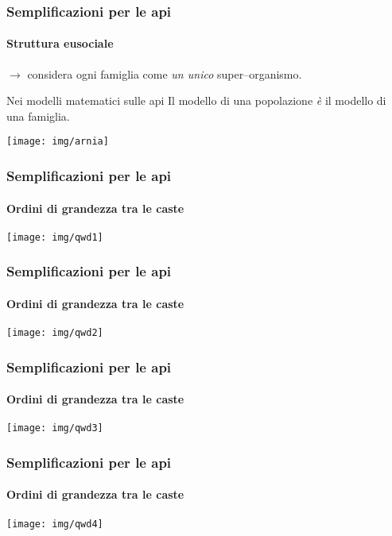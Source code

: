 \documentclass[]{beamer} %
\begin{document}
\begin{frame}
    \frametitle{Semplificazioni per le api}
    \framesubtitle{Struttura eusociale}

    $\rightarrow$ considera ogni famiglia come \emph{un unico} super--organismo.

    \pause
    \begin{alertblock}{Nei modelli matematici sulle api}
        \centering
        Il modello di una popolazione \emph{è} il modello di una famiglia.

        \texttt{[image: img/arnia]}
    \end{alertblock}


\end{frame}

\begin{frame}
    \frametitle{Semplificazioni per le api}
    \framesubtitle{Ordini di grandezza tra le caste}

    \begin{center}
        \texttt{[image: img/qwd1]}
    \end{center}
\end{frame}

\begin{frame}
    \frametitle{Semplificazioni per le api}
    \framesubtitle{Ordini di grandezza tra le caste}

    \begin{center}
        \texttt{[image: img/qwd2]}
    \end{center}
\end{frame}

\begin{frame}
    \frametitle{Semplificazioni per le api}
    \framesubtitle{Ordini di grandezza tra le caste}

    \begin{center}
        \texttt{[image: img/qwd3]}
    \end{center}
\end{frame}

\begin{frame}
    \frametitle{Semplificazioni per le api}
    \framesubtitle{Ordini di grandezza tra le caste}

    \begin{center}
        \texttt{[image: img/qwd4]}
    \end{center}
\end{frame}
\end{document}
